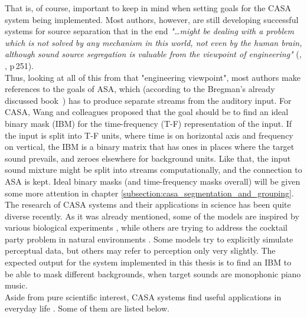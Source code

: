 That is, of course, important to keep in mind when setting goals for the CASA system being implemented. Most authors, however, are still developing successful systems for source separation that in the end \textit{"\dots{}might be dealing with a problem which is not solved by any mechanism in this world, not even by the human brain, although sound source segregation is valuable from the viewpoint of engineering"} (\cite{Goto2004}, \cite{Wang2006}, p\,251).\\

Thus, looking at all of this from that "engineering viewpoint", most authors make references to the goals of ASA, which (according to the Bregman's already discussed book~\cite{Bregman1990}) has to produce separate streams from the auditory input. For CASA, Wang and colleagues \cite{Wang2005} proposed that the goal should be to find an ideal binary mask (IBM) for the time-frequency (T-F) representation of the input. If the input is split into T-F units, where time is on horizontal axis and frequency on vertical, the IBM is a binary matrix that has ones in places where the target sound prevails, and zeroes elsewhere for background units. Like that, the input sound mixture might be split into streams computationally, and the connection to ASA is kept. Ideal binary masks (and time-frequency masks overall) will be given some more attention in chapter \ref{subsection:casa_segmentation_and_grouping}.\\

The research of CASA systems and their applications in science \cite{Szabo2016} has been quite diverse recently. As it was already mentioned, some of the models are inspired by various biological experiments \cite{Wang2008}\cite{Boes2011}, while others are trying to address the cocktail party problem in natural environments \cite{Elhilali2008}. Some models try to explicitly simulate perceptual data, but others may refer to perception only very slightly. The expected output for the system implemented in this thesis is to find an IBM to be able to mask different backgrounds, when target sounds are monophonic piano music.\\

Aside from pure scientific interest, CASA systems find useful applications in everyday life \cite{Wang2006}. Some of them are listed below.

